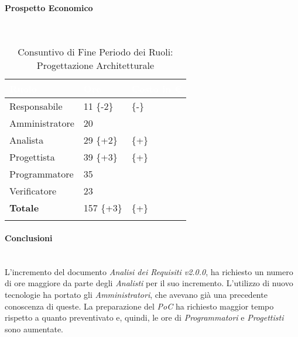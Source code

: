 \paragraph{Prospetto Economico} ~\\

\begin{longtable}{| C{.30\textwidth}| C{.15\textwidth}| C{.20\textwidth}|}
\hline
{}\textbf{\textcolor{white}{Ruolo}} & \textbf{\textcolor{white}{Ore}} & \textbf{\textcolor{white}{Costo in \euro}} \\
\hline 
Responsabile & 11 \{-2\}&  \{-\} \\
\hline
{}Amministratore & 20 &  \\
\hline
Analista & 29 \{+2\} &  \{+\}\\
\hline
{}Progettista & 39 \{+3\} &  \{+\}\\
\hline
Programmatore & 35 &  \\
\hline
{}Verificatore & 23 & \\
\hline
\textbf{Totale} & 157 \{+3\} &  \{+\}\\ 
\hline

\caption{Consuntivo di Fine Periodo dei Ruoli: Progettazione Architetturale}
\label{Distribuzione oraria per ruoli del periodo di pa}
\end{longtable}

\paragraph{Conclusioni} ~\\
L'incremento del documento \textit{Analisi dei Requisiti v2.0.0}, ha richiesto un numero di ore maggiore da parte degli \textit{Analisti} per il suo incremento. L'utilizzo di nuovo tecnologie ha portato gli \textit{Amministratori}, che avevano già una precedente conoscenza di queste. La preparazione del \textit{PoC} ha richiesto maggior tempo rispetto a quanto preventivato e, quindi, le ore di \textit{Programmatori} e \textit{Progettisti} sono aumentate. 

\pagebreak



